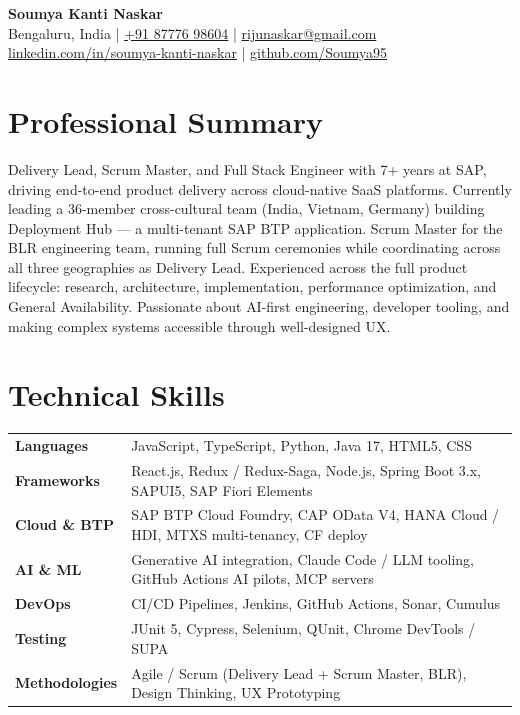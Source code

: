 \documentclass[11pt,a4paper]{article}
\begin{document}
\begin{center}
  {\LARGE\bfseries Soumya Kanti Naskar}\\[4pt]
  Bengaluru, India \quad|\quad
  \href{tel:+918777698604}{+91 87776 98604} \quad|\quad
  \href{mailto:rijunaskar@gmail.com}{rijunaskar@gmail.com}\\[2pt]
  \href{https://www.linkedin.com/in/soumya-kanti-naskar}{linkedin.com/in/soumya-kanti-naskar} \quad|\quad
  \href{https://github.com/Soumya95}{github.com/Soumya95}
\end{center}

\section{Professional Summary}

Delivery Lead, Scrum Master, and Full Stack Engineer with 7+ years at SAP, driving end-to-end product delivery across
cloud-native SaaS platforms. Currently leading a 36-member cross-cultural team (India, Vietnam, Germany)
building Deployment Hub --- a multi-tenant SAP BTP application. Scrum Master for the BLR engineering team,
running full Scrum ceremonies while coordinating across all three geographies as Delivery Lead. Experienced
across the full product lifecycle: research, architecture, implementation, performance optimization, and
General Availability. Passionate about AI-first engineering, developer tooling, and making complex systems
accessible through well-designed UX.

\section{Technical Skills}

\begin{tabularx}{\textwidth}{@{}p{3.2cm}X@{}}
  \textbf{Languages}      & JavaScript, TypeScript, Python, Java 17, HTML5, CSS \\[2pt]
  \textbf{Frameworks}     & React.js, Redux / Redux-Saga, Node.js, Spring Boot 3.x, SAPUI5, SAP Fiori Elements \\[2pt]
  \textbf{Cloud \& BTP}   & SAP BTP Cloud Foundry, CAP OData V4, HANA Cloud / HDI, MTXS multi-tenancy, CF deploy \\[2pt]
  \textbf{AI \& ML}       & Generative AI integration, Claude Code / LLM tooling, GitHub Actions AI pilots, MCP servers \\[2pt]
  \textbf{DevOps}         & CI/CD Pipelines, Jenkins, GitHub Actions, Sonar, Cumulus \\[2pt]
  \textbf{Testing}        & JUnit 5, Cypress, Selenium, QUnit, Chrome DevTools / SUPA \\[2pt]
  \textbf{Methodologies}  & Agile / Scrum (Delivery Lead + Scrum Master, BLR), Design Thinking, UX Prototyping \\
\end{tabularx}
\end{document}
